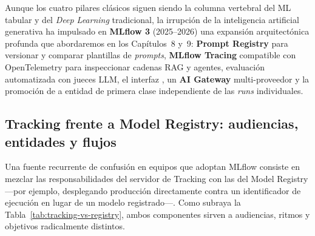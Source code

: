 \begin{modernbox}
 Aunque los cuatro pilares clásicos siguen siendo la columna vertebral del ML tabular y del \textit{Deep Learning} tradicional, la irrupción de la inteligencia artificial generativa ha impulsado en \textbf{MLflow 3} (2025--2026) una expansión arquitectónica profunda que abordaremos en los Capítulos~8 y~9: \textbf{Prompt Registry} para versionar y comparar plantillas de \textit{prompts}, \textbf{MLflow Tracing} compatible con OpenTelemetry para inspeccionar cadenas RAG y agentes, evaluación automatizada  con jueces LLM, el interfaz , un \textbf{AI Gateway} multi-proveedor y la promoción de  a entidad de primera clase independiente de las \textit{runs} individuales.
\end{modernbox}

\subsection{Tracking frente a Model Registry: audiencias, entidades y flujos}

Una fuente recurrente de confusión en equipos que adoptan MLflow consiste en mezclar las responsabilidades del servidor de Tracking con las del Model Registry ---por ejemplo, desplegando producción directamente contra un identificador de ejecución  en lugar de un modelo registrado---. Como subraya la Tabla~\ref{tab:tracking-vs-registry}, ambos componentes sirven a audiencias, ritmos y objetivos radicalmente distintos.

